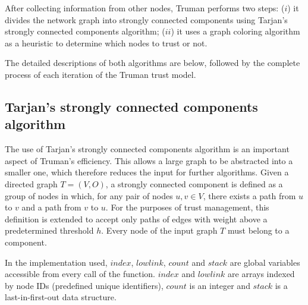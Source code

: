 \documentclass[conference]{IEEEtran}
\begin{document}
After collecting information from other nodes, Truman performs two steps: ($i$) it divides the network graph into strongly connected components using Tarjan's strongly connected components algorithm; ($ii$) it uses a graph coloring algorithm as a heuristic to determine which nodes to trust or not.



The detailed descriptions of both algorithms are below, followed by the complete process of each iteration of the Truman trust model.



\subsection{Tarjan's strongly connected components algorithm}
\label{section:tarjan}
The use of Tarjan's strongly connected components algorithm \cite{tarjan1972depth} is an important aspect of Truman's efficiency.
This allows a large graph to be abstracted into a smaller one, which therefore reduces the input for further algorithms.
Given a directed graph $T = (V,O)$, a strongly connected component is defined as a group of nodes in which, for any pair of nodes $u, v \in V$, there exists a path from $u$ to $v$ and a path from $v$ to $u$.
For the purposes of trust management, this definition is extended to accept only paths of edges with weight above a predetermined threshold $h$.
Every node of the input graph $T$ must belong to a component.

In the implementation used, $index$, $lowlink$, $count$ and $stack$ are global variables accessible from every call of the function.
$index$ and $lowlink$ are arrays indexed by node IDs (predefined unique identifiers), $count$ is an integer and $stack$ is a last-in-first-out data structure.
\end{document}
